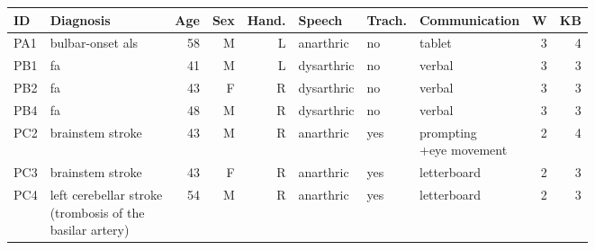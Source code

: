 \sffamily
\footnotesize
\begin{tabular}{@{}llrrrlllrr@{}}
  \toprule
  \textbf{ID}  & \textbf{Diagnosis} & \textbf{Age} & \textbf{Sex} & \textbf{Hand.} &
  \textbf{Speech} & \textbf{Trach.} & \textbf{Communication} &
  \textbf{W} & \textbf{KB} \\ \midrule
  PA1 & bulbar-onset \acs{als} & 58  & M   & L     & anarthric  & no          & tablet                 & 3  & 4 \\
  PB1 & \acs{fa} & 41  & M   & L     & dysarthric & no          & verbal                 & 3  & 3 \\
  PB2 & \acs{fa} & 43  & F   & R     & dysarthric & no          & verbal                 & 3  & 3 \\
  PB4 & \acs{fa} & 48  & M   & R     & dysarthric & no          & verbal                 & 3  & 3 \\
  PC2 & brainstem stroke & 43  & M   & R     & anarthric  & yes         &  \makecell[l]{prompting\\+eye movement} & 2 & 4  \\
  PC3 & brainstem stroke & 43  & F   & R     & anarthric  & yes         & letterboard            & 2  & 3 \\
  PC4 & \makecell[l]{left cerebellar stroke \\ (trombosis of the  \\ basilar  artery)} & 54  & M   & R     & anarthric  & yes & letterboard & 2 & 3 \\
  \bottomrule
\end{tabular}
